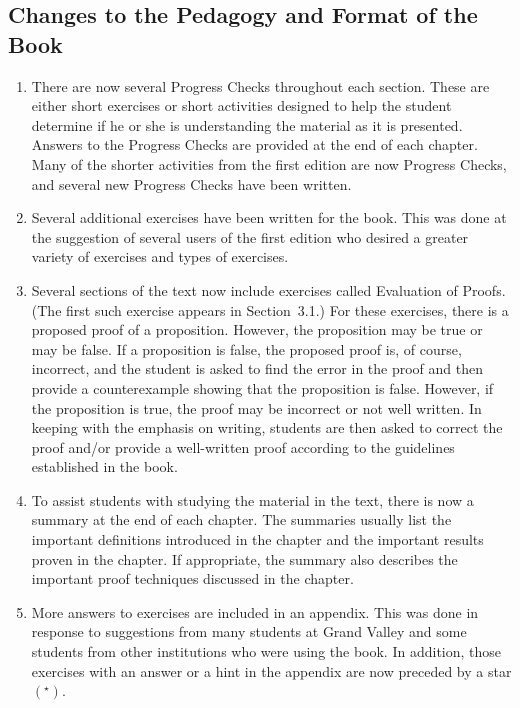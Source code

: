 \subsection*{Changes to the Pedagogy and Format of the Book}
\begin{enumerate}
\item There are now several Progress Checks throughout each section.  These are either short exercises or short activities designed to help the student determine if he or she is understanding the material as it is presented.  Answers to the Progress Checks are provided at the end of each chapter.  Many of the shorter activities from the first edition are now Progress Checks, and several new Progress Checks have been written.


\item Several additional exercises have been written for the book.  This was done at the suggestion of several users of the first edition who desired a greater variety of exercises and types of exercises.

\item Several sections of the text now include exercises called Evaluation of Proofs.  (The first such exercise appears in Section~3.1.)  For these exercises, there is a proposed proof of a proposition.  However, the proposition may be true or may be false.  If a proposition is false, the proposed proof is, of course, incorrect, and the student is asked to find the error in the proof and then provide a counterexample showing that the proposition is false.  However, if the proposition is true, the proof may be incorrect or not well written.  In keeping with the emphasis on writing, students are then asked to correct the proof and/or provide a well-written proof according to the guidelines established in the book.

\item To assist students with studying the material in the text, there is now a summary at the end of each chapter.  The summaries usually list the important definitions introduced in the chapter and the important results proven in the chapter.  If appropriate, the summary also describes the important proof techniques discussed in the chapter.

\item More answers to exercises are included in an appendix.  This was done in response to suggestions from many students at Grand Valley and some students from other institutions who were using the book.  In addition, those exercises with an answer or a hint in the appendix are now preceded by a star 
$\left( ^\star \right)$.
\end{enumerate}

